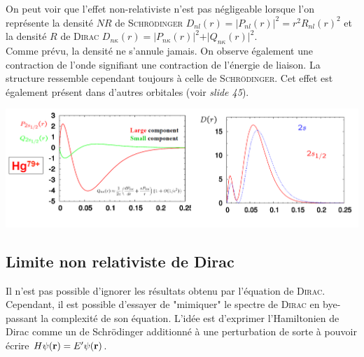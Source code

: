 On peut voir que l'effet non-relativiste n'est pas négligeable lorsque l'on représente la densité
$NR$ de \textsc{Schrödinger} $D_{n l}(r) = \vert P_{nl}(r) \vert^2 = r^2 R_{nl}(r) ^2$ et la 
densité $R$ de \textsc{Dirac} $D_{n \kappa}(r) = \vert P_{n \kappa}(r) \vert^2
+  \vert Q_{n \kappa}(r) \vert^2$.\\

Comme prévu, la densité ne s'annule jamais. On observe également une contraction de l'onde signifiant
une contraction de l'énergie de liaison. La structure ressemble cependant toujours à celle de 
\textsc{Schrödinger}. Cet effet est également présent dans d'autres orbitales (voir \textit{slide 
45}).


\begin{center}
	\includegraphics[scale=0.4]{ch1/image9}
\end{center}

\newpage
\subsection{Limite non relativiste de Dirac}
Il n'est pas possible d'ignorer les résultats obtenu par l'équation de \textsc{Dirac}. Cependant, 
il est possible d'essayer de "mimiquer" le spectre de \textsc{Dirac} en bye-passant la complexité
de son équation. L'idée est d'exprimer l'Hamiltonien de Dirac comme un de Schrödinger additionné à
une perturbation de sorte à pouvoir écrire $H \psi ({\bf r}) = E' \psi ({\bf r})$. \\

